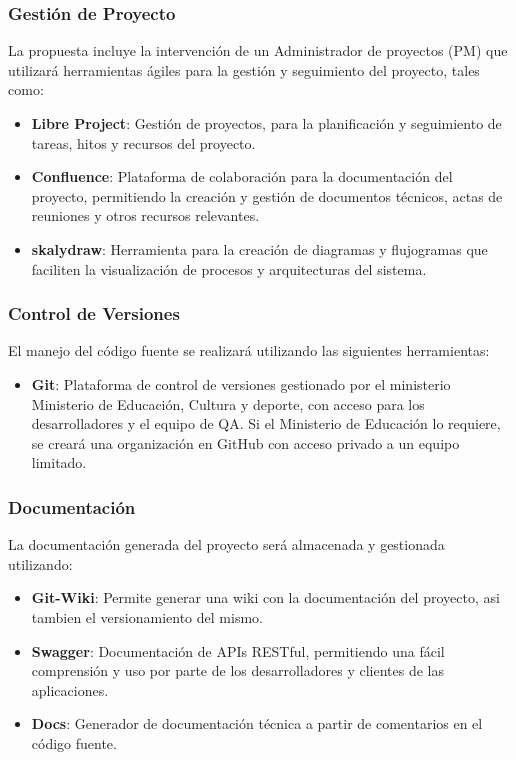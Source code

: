 \subsubsection{Gestión de Proyecto}
La propuesta incluye la intervención de un Administrador de proyectos (PM) que utilizará herramientas ágiles para la gestión y seguimiento del proyecto, tales como:
\begin{itemize}
    \item \textbf{Libre Project}: Gestión de proyectos, para la planificación y seguimiento de tareas, hitos y recursos del proyecto.
    \item \textbf{Confluence}: Plataforma de colaboración para la documentación del proyecto, permitiendo la creación y gestión de documentos técnicos, actas de reuniones y otros recursos relevantes.
    \item \textbf{skalydraw}: Herramienta para la creación de diagramas y flujogramas que faciliten la visualización de procesos y arquitecturas del sistema.
\end{itemize}
\subsubsection{Control de Versiones}
El manejo del código fuente se realizará utilizando las siguientes herramientas:
\begin{itemize}
    \item \textbf{Git}: Plataforma de control de versiones gestionado por el ministerio Ministerio de Educación, Cultura y deporte, con acceso para los desarrolladores y el equipo de QA.
    Si el Ministerio de Educación lo requiere, se creará una organización en GitHub con acceso privado a un equipo limitado.
\end{itemize}
\subsubsection{Documentación}
La documentación generada del proyecto será almacenada y gestionada utilizando:
\begin{itemize}
    \item \textbf{Git-Wiki}: Permite generar una wiki con la documentación del proyecto, asi tambien el versionamiento del mismo.
    \item \textbf{Swagger}: Documentación de APIs RESTful, permitiendo una fácil comprensión y uso por parte de los desarrolladores y clientes de las aplicaciones.
    \item \textbf{Docs}: Generador de documentación técnica a partir de comentarios en el código fuente.
\end{itemize}
